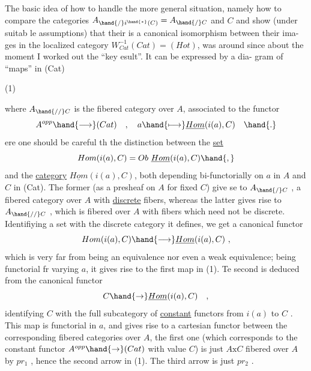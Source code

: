 
The basic idea of how to handle the more general situation,  namely
how to compare the categories $A_{\hand{/}i^{\hand{*}}(C)} = A_{\hand{/}C}$ and $C$\hand{,} and show (under suitab%
le assumptions)  that their is a canonical isomorphism between their ima-%
ges in the localized category $W_{Cat}^{-1}(Cat) = (Hot)$,  was around since about
the moment I worked out the ``key esult''.  It can be expressed by a dia-%
gram of ``maps'' in (Cat)

(1) 

where $A_{\hand{//}C}$ is the fibered category over $A$,  associated to the functor
\[ A^{opp} \hand{\longrightarrow} (Cat) \quad , \quad a \hand{\longmapsto} \underline{Hom}(i(a),C) \quad \hand{.} \]
ere one should be careful th the distinction  between the \uline{set}
\[ Hom(i(a),C) = Ob\ \underline{Hom}(i(a),C)\hand{,} \]
and the \uline{category} $\underline{Hom}(i(a),C)$,  both depending bi-functorially on $a$ in $A$
and $C$ in (Cat).  The former (as a presheaf on $A$ for fixed $C$)  give se
to $A_{\hand{/}C}$ ,  a fibered category over $A$ with \uline{discrete} fibers,  whereas the
latter gives rise to $A_{\hand{//}C}$ ,  which is fibered over $A$ with fibers which
need not be discrete.  Identifiying a set with the discrete category it
defines,  we get a canonical functor
\[ Hom(i(a),C) \hand{\longrightarrow} \underline{Hom}(i(a),C) \ , \]
which is very far from being an equivalence nor even a weak equivalence;
being functorial fr varying $a$,  it gives rise to the first map in (1).
Te second is deduced from the canonical functor
\[ C \hand{\rightarrow} \underline{Hom}(i(a),C) \quad , \]
identifying $C$ with the full subcategory of \uline{constant} functors from $i(a)$ to
$C$ .  This map is functorial in $a$,  and gives rise  to a cartesian functor
between the corresponding fibered categories over $A$,  the first one
(which corresponds to the constant functor $A^{opp}\hand{\rightarrow}(Cat)$ with value $C$) is
just $A\mathrm{x}C$ fibered over $A$ by $pr_{1}$ ,  hence the second arrow in (1).  The
third arrow is just $pr_{2}$ .


